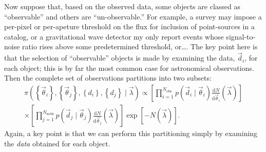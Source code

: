 \documentclass[modern]{aastex62}
\newcommand{\dd}{\mathrm{d}}
\newcommand{\diff}[2]{\frac{\dd #1}{\dd #2}}
\newcommand{\Nnobs}{N_\mathrm{nobs}}
\newcommand{\Nobs}{N_\mathrm{obs}}
\newcommand{\vd}{\vec{d}}
\newcommand{\vlambda}{\vec{\lambda}}
\newcommand{\vtheta}{\vec{\theta}}
\begin{document}
Now suppose that, based on the observed data, some objects are classed as
``observable'' and others are ``un-observable.''  For example, a survey may
impose a per-pixel or per-apeture threshold on the flux for inclusion of
point-sources in a catalog, or a gravitational wave detector my only report
events whose signal-to-noise ratio rises above some predetermined threshold,
or\ldots.  The key point here is that the selection of ``observable'' objects is
made by examining the data, $\vd_i$, for each object; this is by far the most
common case for astronomical observations.  Then the complete set of
observations partitions into two subsets:
%
\begin{multline}
  \pi\left(\left\{ \vtheta_i \right\}, \left\{ \vtheta_j \right\}, \left\{ d_i \right\}, \left\{ d_j \right\} \mid \vlambda \right) \propto \left[ \prod_{i=1}^{\Nobs} p\left( \vd_i \mid \vtheta_i \right) \diff{N}{\vtheta_i}\left( \vlambda \right) \right] \\ \times \left[ \prod_{j=1}^{\Nnobs} p\left( \vd_j \mid \vtheta_j \right) \diff{N}{\vtheta_j}\left( \vlambda \right) \right] \exp\left[ - N\left( \vlambda \right) \right].
\end{multline}
%
Again, a key point is that we can perform this partitioning simply by examining
the \emph{data} obtained for each object.
\end{document}
